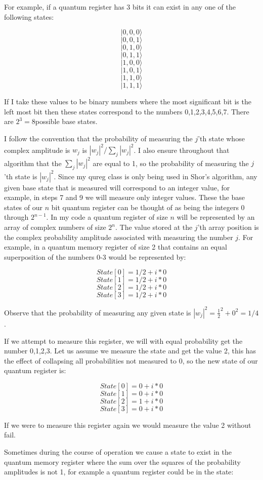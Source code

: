 \documentclass[]{article}
\begin{document}
For example, if a quantum register has 3 bits it can exist in any one
of the following states:

\[|0,0,0 \rangle \]
\[|0,0,1 \rangle \]
\[|0,1,0 \rangle \]
\[|0,1,1 \rangle \]
\[|1,0,0 \rangle \]
\[|1,0,1 \rangle \]
\[|1,1,0 \rangle \]
\[|1,1,1 \rangle \]

If I take these values to be binary numbers where the most significant
bit is the left most bit then these states correspond to the numbers
0,1,2,3,4,5,6,7.  There are $2^{3} = 8 $possible base states.

I follow the convention that the probability of measuring the $j$'th
state whose complex amplitude is $w_{j}$ is
$|w_{j}|^{2}/\sum_{j}|w_{j}|^{2}$. I also ensure throughout that
algorithm that the $\sum_{j}|w_{j}|^{2}$ are equal to 1, so the
probability of measuring the $j$'th state is $|w_{j}|^{2}$.  Since my
qureg class is only being used in Shor's algorithm, any given base
state that is measured will correspond to an integer value, for
example, in steps 7 and 9 we will measure only integer values.  These
the base states of our $n$ bit quantum register can be thought of as
being the integers 0 through $2^{n - 1}$.  In my code a quantum
register of size $n$ will be represented by an array of complex
numbers of size $2^{n}$.  The value stored at the $j$'th array
position is the complex probability amplitude associated with
measuring the number $j$.  For example, in a quantum memory register
of size 2 that contains an equal superposition of the numbers 0-3
would be represented by:

\[State[0] = 1/2 + i * 0 \]
\[State[1] = 1/2 + i * 0 \]
\[State[2] = 1/2 + i * 0\]
\[State[3] = 1/2 + i * 0\]

Observe that the probability of measuring any given state is
$|w_{j}|^{2} = \frac{1}{2}^{2} + 0^{2} = 1/4$.

If we attempt to measure this register, we will with equal probability
get the number 0,1,2,3.  Let us assume we measure the state and get
the value 2, this has the effect of collapsing all probabilities not
measured to 0, so the new state of our quantum register is:

\[State[0] = 0 + i * 0\]
\[State[1] = 0 + i * 0\] 
\[State[2] = 1 + i * 0\] 
\[State[3] = 0 + i * 0\] 

If we were to measure this register again we would measure the value 2
without fail.

Sometimes during the course of operation we cause a state to exist in
the quantum memory register where the sum over the squares of the
probability amplitudes is not 1, for example a quantum register could
be in the state:
\end{document}
